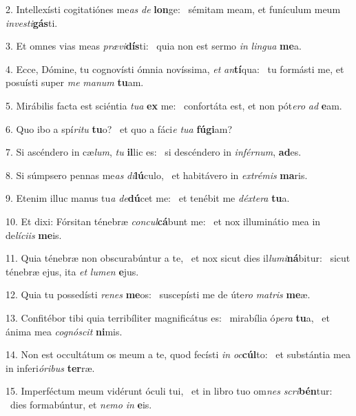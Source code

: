 2. Intellexísti cogitatiónes me\textit{as} \textit{de} \textbf{lon}ge: \ast\  sémitam meam, et funículum meum \textit{in}\textit{ves}\textit{ti}\textbf{gás}ti.\

3. Et omnes vias meas \textit{præ}\textit{vi}\textbf{dís}ti: \ast\  quia non est sermo \textit{in} \textit{lin}\textit{gua} \textbf{me}a.\

4. Ecce, Dómine, tu cognovísti ómnia novíssima, \textit{et} \textit{an}\textbf{tí}qua: \ast\  tu formásti me, et posuísti super \textit{me} \textit{ma}\textit{num} \textbf{tu}am.\

5. Mirábilis facta est sciéntia \textit{tu}\textit{a} \textbf{ex} me: \ast\  confortáta est, et non pót\textit{e}\textit{ro} \textit{ad} \textbf{e}am.\

6. Quo ibo a spí\textit{ri}\textit{tu} \textbf{tu}o? \ast\  et quo a fáci\textit{e} \textit{tu}\textit{a} \textbf{fú}\textbf{gi}am?\

7. Si ascéndero in cæ\textit{lum}, \textit{tu} \textbf{il}lic es: \ast\  si descéndero in \textit{in}\textit{fér}\textit{num}, \textbf{ad}es.\

8. Si súmpsero pennas me\textit{as} \textit{di}\textbf{lú}culo, \ast\  et habitávero in \textit{ex}\textit{tré}\textit{mis} \textbf{ma}ris.\

9. Etenim illuc manus tu\textit{a} \textit{de}\textbf{dú}cet me: \ast\  et tenébit me \textit{déx}\textit{te}\textit{ra} \textbf{tu}a.\

10. Et dixi: Fórsitan ténebræ \textit{con}\textit{cul}\textbf{cá}bunt me: \ast\  et nox illuminátio mea in de\textit{lí}\textit{ci}\textit{is} \textbf{me}is.\

11. Quia ténebræ non obscurabúntur a te, \dag\  et nox sicut dies il\textit{lu}\textit{mi}\textbf{ná}bitur: \ast\  sicut ténebræ ejus, ita \textit{et} \textit{lu}\textit{men} \textbf{e}jus.\

12. Quia tu possedísti \textit{re}\textit{nes} \textbf{me}os: \ast\  suscepísti me de úte\textit{ro} \textit{ma}\textit{tris} \textbf{me}æ.\

13. Confitébor tibi quia terribíliter magnificátus es: \dag\  mirabília ó\textit{pe}\textit{ra} \textbf{tu}a, \ast\  et ánima mea \textit{co}\textit{gnó}\textit{scit} \textbf{ni}mis.\

14. Non est occultátum os meum a te, quod fecísti \textit{in} \textit{oc}\textbf{cúl}to: \ast\  et substántia mea in inferi\textit{ó}\textit{ri}\textit{bus} \textbf{ter}ræ.\

15. Imperféctum meum vidérunt óculi tui, \dag\  et in libro tuo om\textit{nes} \textit{scri}\textbf{bén}tur: \ast\  dies formabúntur, et \textit{ne}\textit{mo} \textit{in} \textbf{e}is.\

